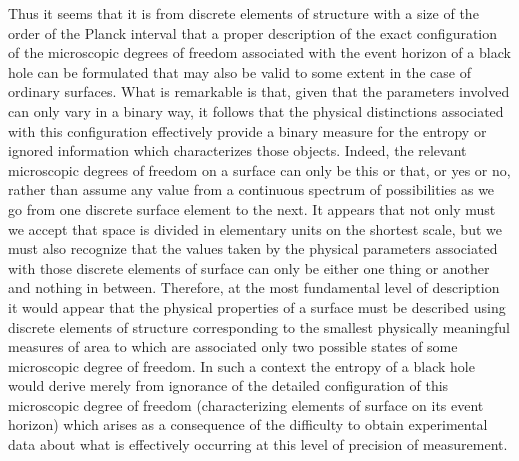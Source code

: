 \documentclass[notitlepage,12pt]{report}
\begin{document}
Thus it seems that it is from discrete elements of structure with a size of the order of the Planck interval that a proper description of the exact configuration of the microscopic degrees of freedom associated with the event horizon of a black hole can be formulated that may also be valid to some extent in the case of ordinary surfaces. What is remarkable is that, given that the parameters involved can only vary in a binary way, it follows that the physical distinctions associated with this configuration effectively provide a binary measure for the entropy or ignored information which characterizes those objects. Indeed, the relevant microscopic degrees of freedom on a surface can only be this or that, or yes or no, rather than assume any value from a continuous spectrum of possibilities as we go from one discrete surface element to the next. It appears that not only must we accept that space is divided in elementary units on the shortest scale, but we must also recognize that the values taken by the physical parameters associated with those discrete elements of surface can only be either one thing or another and nothing in between. Therefore, at the most fundamental level of description it would appear that the physical properties of a surface must be described using discrete elements of structure corresponding to the smallest physically meaningful measures of area to which are associated only two possible states of some microscopic degree of freedom. In such a context the entropy of a black hole would derive merely from ignorance of the detailed configuration of this microscopic degree of freedom (characterizing elements of surface on its event horizon) which arises as a consequence of the difficulty to obtain experimental data about what is effectively occurring at this level of precision of measurement.
\end{document}
